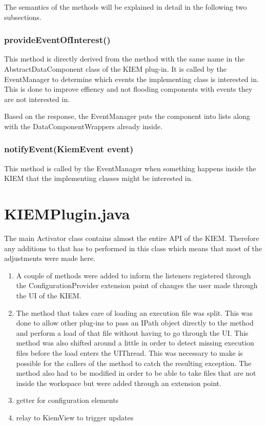 The semantics of the methods will be explained in detail in the following two subsections.

\subsubsection*{provideEventOfInterest()}
This method is directly derived from the method with the same name in the AbstractDataComponent class
of the \ac{KIEM} plug-in. It is called by the EventManager to determine which events the implementing
class is interested in. This is done to improve effiency and not flooding components with events
they are not interested in.

Based on the response, the EventManager puts the component into lists along with the DataComponentWrappers
already inside.
\subsubsection*{notifyEvent(KiemEvent event)}
This method is called by the EventManager when something happens inside the \ac{KIEM} that the implementing
classes might be interested in.



\section{KIEMPlugin.java}
The main Activator class contains almost the entire \ac{API} of the \ac{KIEM}.
Therefore any additions to that has to performed in this class which means that
most of the adjustments were made here.


\begin{enumerate}
 \item A couple of methods were added to inform the listeners registered through
the ConfigurationProvider extension point of changes the user made through the \ac{UI} of the \ac{KIEM}.
 \item The method that takes care of loading an execution file was split. This was done to allow
other plug-ins to pass an IPath object directly to the method and perform a load of that file without
having to go through the \ac{UI}. This method was also shifted around a little in order to detect
missing execution files before the load enters the UIThread. This was necessary to make is possible for
the callers of the method to catch the resulting exception.
The method also had to be modified in order to be able to take files that are not inside the workspace
but were added through an extension point.
 \item getter for configuration elements
 \item relay to KiemView to trigger updates
\end{enumerate}

